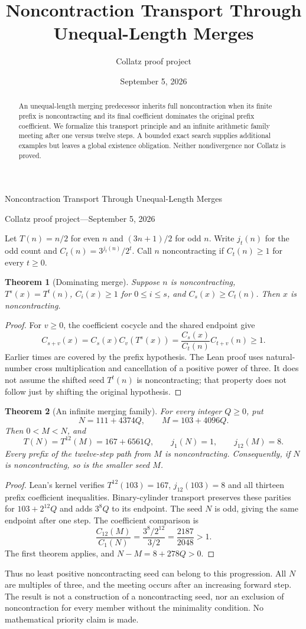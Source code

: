 \documentclass[10pt]{article}
\title{Noncontraction Transport Through Unequal-Length Merges}
\author{Collatz proof project}
\date{September 5, 2026}
\newtheorem{theorem}{Theorem}
\begin{document}
\begin{center}
{\Large Noncontraction Transport Through Unequal-Length Merges}\par\medskip
Collatz proof project\quad---\quad September 5, 2026
\end{center}
\begin{abstract}
An unequal-length merging predecessor inherits full noncontraction when
its finite prefix is noncontracting and its final coefficient dominates
the original prefix coefficient. We formalize this transport principle
and an infinite arithmetic family meeting after one versus twelve steps.
A bounded exact search supplies additional examples but leaves a global
existence obligation. Neither nondivergence nor Collatz is proved.
\end{abstract}
Let $T(n)=n/2$ for even $n$ and $(3n+1)/2$ for odd $n$. Write
$j_t(n)$ for the odd count and $C_t(n)=3^{j_t(n)}/2^t$.
Call $n$ noncontracting if $C_t(n)\geq1$ for every $t\geq0$.

\begin{theorem}[Dominating merge]
Suppose $n$ is noncontracting, $T^s(x)=T^t(n)$,
$C_i(x)\geq1$ for $0\leq i\leq s$, and $C_s(x)\geq C_t(n)$.
Then $x$ is noncontracting.
\end{theorem}
\begin{proof}
For $v\geq0$, the coefficient cocycle and the shared endpoint give
\[
C_{s+v}(x)=C_s(x)C_v(T^s(x))
 =\frac{C_s(x)}{C_t(n)}C_{t+v}(n)\geq1.
\]
Earlier times are covered by the prefix hypothesis. The Lean proof uses
natural-number cross multiplication and cancellation of a positive power
of three. It does not assume the shifted seed $T^t(n)$ is noncontracting;
that property does not follow just by shifting the original hypothesis.
\end{proof}

\begin{theorem}[An infinite merging family]
For every integer $Q\geq0$, put
\[
N=111+4374Q,\qquad M=103+4096Q.
\]
Then $0<M<N$, and
\[
T(N)=T^{12}(M)=167+6561Q,\qquad j_1(N)=1,\qquad j_{12}(M)=8.
\]
Every prefix of the twelve-step path from $M$ is noncontracting.
Consequently, if $N$ is noncontracting, so is the smaller seed $M$.
\end{theorem}
\begin{proof}
Lean's kernel verifies $T^{12}(103)=167$, $j_{12}(103)=8$ and all
thirteen prefix coefficient inequalities. Binary-cylinder transport
preserves these parities for $103+2^{12}Q$ and adds $3^8Q$ to its
endpoint. The seed $N$ is odd, giving the same endpoint after one step.
The coefficient comparison is
\[
\frac{C_{12}(M)}{C_1(N)}
=\frac{3^8/2^{12}}{3/2}=\frac{2187}{2048}>1.
\]
The first theorem applies, and $N-M=8+278Q>0$.
\end{proof}
Thus no least positive noncontracting seed can belong to this progression.
All $N$ are multiples of three, and the meeting occurs after an increasing
forward step. The result is not a construction of a noncontracting seed,
nor an exclusion of noncontraction for every member without the minimality
condition. No mathematical priority claim is made.
\end{document}
